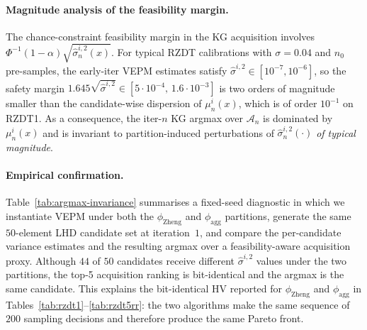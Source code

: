 \documentclass[12pt]{article}
\theoremstyle{plain}
\theoremstyle{definition}
\theoremstyle{remark}
\begin{document}
\paragraph{Magnitude analysis of the feasibility margin.}
The chance-constraint feasibility margin in the
KG acquisition involves $\Phi^{-1}(1-\alpha)\sqrt{\hat\sigma^{i,2}_n(x)}$.
For typical RZDT calibrations with $\sigma=0.04$ and $n_0$ pre-samples,
the early-iter VEPM estimates satisfy $\hat\sigma^{i,2}\in[10^{-7},
10^{-6}]$, so the safety margin $1.645\sqrt{\hat\sigma^{i,2}}\in[5\cdot
10^{-4},\,1.6\cdot 10^{-3}]$ is two orders of magnitude smaller than the
candidate-wise dispersion of $\mu^{i}_n(x)$, which is of order $10^{-1}$
on RZDT1.  As a consequence, the iter-$n$ KG argmax over $\mathcal{A}_n$
is dominated by $\mu^{i}_n(x)$ and is invariant to partition-induced
perturbations of $\hat\sigma^{i,2}_n(\cdot)$ \emph{of typical magnitude}.

\paragraph{Empirical confirmation.}
Table~\ref{tab:argmax-invariance} summarises a fixed-seed diagnostic in
which we instantiate VEPM under both the $\phi_{\mathrm{Zheng}}$ and
$\phi_{\mathrm{agg}}$ partitions, generate the same $50$-element
LHD candidate set at iteration~$1$, and compare the per-candidate
variance estimates and the resulting argmax over a feasibility-aware
acquisition proxy.  Although $44$ of $50$ candidates receive different
$\hat\sigma^{i,2}$ values under the two partitions, the top-5 acquisition
ranking is bit-identical and the argmax is the same candidate.  This
explains the bit-identical HV reported for $\phi_{\mathrm{Zheng}}$ and
$\phi_{\mathrm{agg}}$ in Tables~\ref{tab:rzdt1}--\ref{tab:rzdt5rr}: the
two algorithms make the same sequence of $200$ sampling decisions and
therefore produce the same Pareto front.
\end{document}
